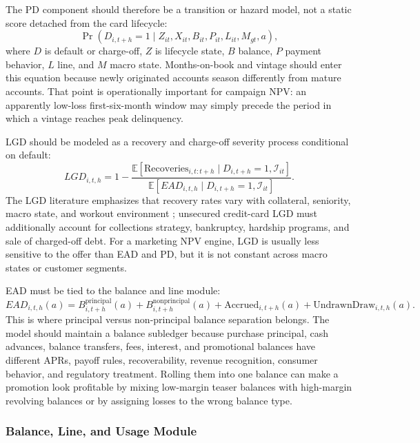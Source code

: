 \documentclass[11pt]{article}
\newcommand{\E}{\mathbb{E}}
\newcommand{\1}{\mathbf{1}}
\begin{document}
The PD component should therefore be a transition or hazard model, not a static
score detached from the card lifecycle:
\begin{equation}
  \Pr(D_{i,t+h}=1\mid Z_{it},X_{it},B_{it},P_{it},L_{it},M_{gt},a),
  \label{eq:pd-transition}
\end{equation}
where $D$ is default or charge-off, $Z$ is lifecycle state, $B$ balance, $P$
payment behavior, $L$ line, and $M$ macro state. Months-on-book and vintage
should enter this equation because newly originated accounts season differently
from mature accounts. That point is operationally important for campaign NPV:
an apparently low-loss first-six-month window may simply precede the period in
which a vintage reaches peak delinquency.

LGD should be modeled as a recovery and charge-off severity process conditional
on default:
\begin{equation}
  LGD_{i,t,h}
  =
  1-
  \frac{\E[\mathrm{Recoveries}_{i,t:t+h}\mid D_{i,t+h}=1,\mathcal{I}_{it}]}
       {\E[EAD_{i,t,h}\mid D_{i,t+h}=1,\mathcal{I}_{it}]}.
  \label{eq:lgd-recovery}
\end{equation}
The LGD literature emphasizes that recovery rates vary with collateral,
seniority, macro state, and workout environment \citep{schuermann2004lgd};
unsecured credit-card LGD must additionally account for collections strategy,
bankruptcy, hardship programs, and sale of charged-off debt. For a marketing
NPV engine, LGD is usually less sensitive to the offer than EAD and PD, but it
is not constant across macro states or customer segments.

EAD must be tied to the balance and line module:
\begin{equation}
  EAD_{i,t,h}(a)
  =
  B_{i,t+h}^{\mathrm{principal}}(a)
  + B_{i,t+h}^{\mathrm{nonprincipal}}(a)
  + \mathrm{Accrued}_{i,t+h}(a)
  + \mathrm{UndrawnDraw}_{i,t,h}(a).
  \label{eq:ead-balance-link}
\end{equation}
This is where principal versus non-principal balance separation belongs. The
model should maintain a balance subledger because
purchase principal, cash advances, balance transfers, fees, interest, and
promotional balances have different APRs, payoff rules, recoverability, revenue
recognition, consumer behavior, and regulatory treatment. Rolling them into one
balance can make a promotion look profitable by mixing low-margin teaser
balances with high-margin revolving balances or by assigning losses to the
wrong balance type.

\subsubsection{Balance, Line, and Usage Module}
\label{subsec:balance-module}
\end{document}
